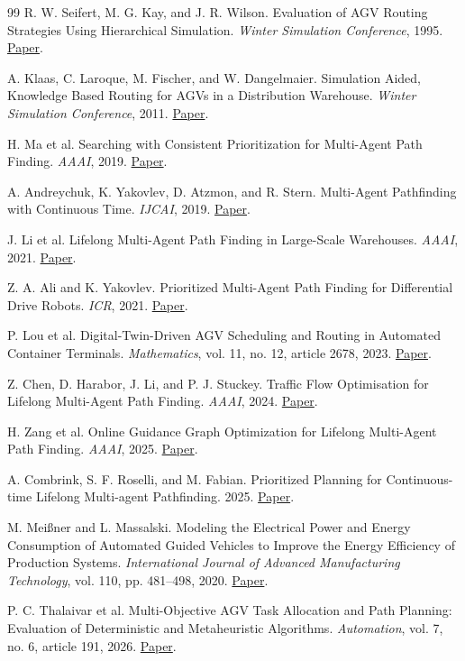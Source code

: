 \documentclass[11pt]{article}
\begin{document}
\begin{thebibliography}{99}
R. W. Seifert, M. G. Kay, and J. R. Wilson.
Evaluation of AGV Routing Strategies Using Hierarchical Simulation.
\emph{Winter Simulation Conference}, 1995.
\href{https://informs-sim.org/wsc95papers/1995_0129.pdf}{Paper}.

A. Klaas, C. Laroque, M. Fischer, and W. Dangelmaier.
Simulation Aided, Knowledge Based Routing for AGVs in a Distribution Warehouse.
\emph{Winter Simulation Conference}, 2011.
\href{https://www.informs-sim.org/wsc11papers/149.pdf}{Paper}.

H. Ma et al. Searching with Consistent Prioritization for Multi-Agent
Path Finding. \emph{AAAI}, 2019.
\href{https://arxiv.org/abs/1812.06356}{Paper}.

A. Andreychuk, K. Yakovlev, D. Atzmon, and R. Stern.
Multi-Agent Pathfinding with Continuous Time. \emph{IJCAI}, 2019.
\href{https://www.ijcai.org/proceedings/2019/6}{Paper}.

J. Li et al. Lifelong Multi-Agent Path Finding in Large-Scale Warehouses.
\emph{AAAI}, 2021.
\href{https://arxiv.org/abs/2005.07371}{Paper}.

Z. A. Ali and K. Yakovlev. Prioritized Multi-Agent Path Finding for
Differential Drive Robots. \emph{ICR}, 2021.
\href{https://arxiv.org/abs/2108.05145}{Paper}.

P. Lou et al. Digital-Twin-Driven AGV Scheduling and Routing in Automated
Container Terminals. \emph{Mathematics}, vol. 11, no. 12, article 2678, 2023.
\href{https://doi.org/10.3390/math11122678}{Paper}.

Z. Chen, D. Harabor, J. Li, and P. J. Stuckey. Traffic Flow Optimisation
for Lifelong Multi-Agent Path Finding. \emph{AAAI}, 2024.
\href{https://ojs.aaai.org/index.php/AAAI/article/view/30054}{Paper}.

H. Zang et al. Online Guidance Graph Optimization for Lifelong Multi-Agent
Path Finding. \emph{AAAI}, 2025.
\href{https://ojs.aaai.org/index.php/AAAI/article/view/33614}{Paper}.

A. Combrink, S. F. Roselli, and M. Fabian. Prioritized Planning for
Continuous-time Lifelong Multi-agent Pathfinding. 2025.
\href{https://arxiv.org/abs/2503.13175}{Paper}.

M. Mei{\ss}ner and L. Massalski. Modeling the Electrical Power and Energy
Consumption of Automated Guided Vehicles to Improve the Energy Efficiency of
Production Systems. \emph{International Journal of Advanced Manufacturing
Technology}, vol. 110, pp. 481--498, 2020.
\href{https://doi.org/10.1007/s00170-020-05796-8}{Paper}.

P. C. Thalaivar et al. Multi-Objective AGV Task Allocation and Path Planning:
Evaluation of Deterministic and Metaheuristic Algorithms. \emph{Automation},
vol. 7, no. 6, article 191, 2026.
\href{https://www.mdpi.com/2673-4052/7/6/191}{Paper}.
\end{thebibliography}
\end{document}
